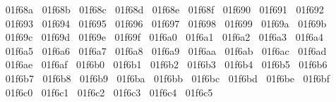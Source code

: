 {  ^^^^^^01f68a%
  ^^^^^^01f68b%
  ^^^^^^01f68c%
  ^^^^^^01f68d%
  ^^^^^^01f68e%
  ^^^^^^01f68f%
  ^^^^^^01f690%
  ^^^^^^01f691%
  ^^^^^^01f692%
  ^^^^^^01f693%
  ^^^^^^01f694%
  ^^^^^^01f695%
  ^^^^^^01f696%
  ^^^^^^01f697%
  ^^^^^^01f698%
  ^^^^^^01f699%
  ^^^^^^01f69a%
  ^^^^^^01f69b%
  ^^^^^^01f69c%
  ^^^^^^01f69d%
  ^^^^^^01f69e%
  ^^^^^^01f69f%
  ^^^^^^01f6a0%
  ^^^^^^01f6a1%
  ^^^^^^01f6a2%
  ^^^^^^01f6a3%
  ^^^^^^01f6a4%
  ^^^^^^01f6a5%
  ^^^^^^01f6a6%
  ^^^^^^01f6a7%
  ^^^^^^01f6a8%
  ^^^^^^01f6a9%
  ^^^^^^01f6aa%
  ^^^^^^01f6ab%
  ^^^^^^01f6ac%
  ^^^^^^01f6ad%
  ^^^^^^01f6ae%
  ^^^^^^01f6af%
  ^^^^^^01f6b0%
  ^^^^^^01f6b1%
  ^^^^^^01f6b2%
  ^^^^^^01f6b3%
  ^^^^^^01f6b4%
  ^^^^^^01f6b5%
  ^^^^^^01f6b6%
  ^^^^^^01f6b7%
  ^^^^^^01f6b8%
  ^^^^^^01f6b9%
  ^^^^^^01f6ba%
  ^^^^^^01f6bb%
  ^^^^^^01f6bc%
  ^^^^^^01f6bd%
  ^^^^^^01f6be%
  ^^^^^^01f6bf%
  ^^^^^^01f6c0%
  ^^^^^^01f6c1%
  ^^^^^^01f6c2%
  ^^^^^^01f6c3%
  ^^^^^^01f6c4%
  ^^^^^^01f6c5%
  ^^00}
\lst@RestoreCatcodes
\makeatother